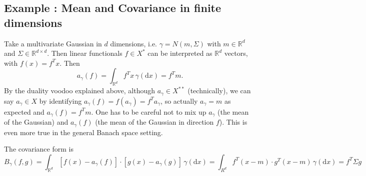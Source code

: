 \documentclass{scrartcl}
\theoremstyle{definition}
\theoremstyle{remark}
\newcommand{\de}{\mathrm d}
\newcommand{\R}{\mathbb R}
\newcommand*\circled[1]{\tikz[baseline=(char.base)]{
            \node[shape=circle,draw,inner sep=2pt] (char) {#1};}}
\DeclareRobustCommand{\myboxtwo}[2][blue!20]{%
\begin{tcolorbox}[   %
        breakable,
        left=0pt,
        right=0pt,
        top=0pt,
        bottom=0pt,
        colback=#1,
        colframe=#1,
        width=\dimexpr\textwidth\relax, 
        enlarge left by=0mm,
        boxsep=5pt,
        arc=10pt,outer arc=10pt,
        ]
        #2
\end{tcolorbox}
}
\begin{document}
\myboxtwo{\subsection*{Example \circled{1}: Mean and Covariance in finite dimensions}
Take a multivariate Gaussian in $d$ dimensions, i.e. $\gamma = N(m, \Sigma)$ with $m\in\R^d$ and $\Sigma\in\R^{d\times d}$. Then linear functionals $f\in X^*$ can be interpreted as $\R^d$ vectors, with $f(x) = f^Tx$. Then 
\[a_\gamma(f) = \int_{\R^d}f^Tx \, \gamma(\de x) = f^T m.\] By the duality voodoo explained above, although $a_\gamma \in X^{**}$ (technically), we can say $a_\gamma\in X$ by identifying $a_\gamma(f) = f(a_\gamma) = f^T a_\gamma$, so actually $a_\gamma = m$ as expected and $a_\gamma(f) = f^Tm$. One has to be careful not to mix up $a_\gamma$ (the mean of the Gaussian) and $a_\gamma(f)$ (the mean of the Gaussian in direction $f$). This is even more true in the general Banach space setting.

The covariance form is 
\[B_\gamma(f, g) = \int_{\R^d}[f(x)-a_\gamma(f)]\cdot [g(x)-a_\gamma(g)]\, \gamma(\de x) = \int_{R^d}f^T(x-m)\cdot g^T(x-m) \, \gamma(\de x) = f^T\Sigma g\]
}
\end{document}
